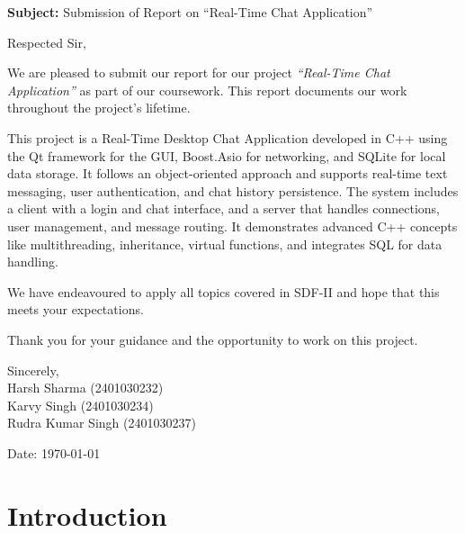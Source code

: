 \documentclass[12pt,a4paper]{article}
\begin{document}
\vspace{1cm}

\noindent
\textbf{Subject:} Submission of Report on ``Real-Time Chat Application''

\vspace{1cm}

\noindent
Respected Sir,

\vspace{1em}

\noindent
We are pleased to submit our report for our project \textit{``Real-Time Chat Application''} as part of our coursework. This report documents our work throughout the project's lifetime. \vspace{1em}

\noindent
This project is a Real-Time Desktop Chat Application developed in C++ using the Qt framework for the GUI, Boost.Asio for networking, and SQLite for local data storage. It follows an object-oriented approach and supports real-time text messaging, user authentication, and chat history persistence. The system includes a client with a login and chat interface, and a server that handles connections, user management, and message routing. It demonstrates advanced C++ concepts like multithreading, inheritance, virtual functions, and integrates SQL for data handling.
\vspace{1em}

\noindent
We have endeavoured to apply all topics covered in SDF-II and hope that this meets your expectations.
\vspace{1em}

\noindent
Thank you for your guidance and the opportunity to work on this project.

\vspace{2em}

\noindent
Sincerely, \\[2em]

\noindent
Harsh Sharma (2401030232)\\
Karvy Singh (2401030234)\\
Rudra Kumar Singh (2401030237)\\

\vspace{2cm}

\noindent
Date: \today

\newpage

\tableofcontents

\newpage

\section{Introduction}
\end{document}
